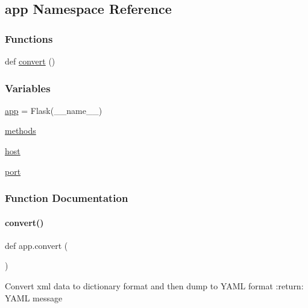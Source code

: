\hypertarget{namespaceapp}{}\subsection{app Namespace Reference}
\label{namespaceapp}
\subsubsection*{Functions}
\begin{DoxyCompactItemize}
\item 
def \mbox{\hyperlink{namespaceapp_a354f40316fa35909af99d6073d4da432}{convert}} ()
\end{DoxyCompactItemize}
\subsubsection*{Variables}
\begin{DoxyCompactItemize}
\item 
\mbox{\hyperlink{namespaceapp_a675b4ea702c13dc4b8c05f985a25b496}{app}} = Flask(\+\_\+\+\_\+name\+\_\+\+\_\+)
\item 
\mbox{\hyperlink{namespaceapp_acc2d9f753751d59302fae3b2bfe99571}{methods}}
\item 
\mbox{\hyperlink{namespaceapp_a7fa7c11c7474c128736b1d34b15a0d5e}{host}}
\item 
\mbox{\hyperlink{namespaceapp_ae996542be63ac459a38531f7c2dd0a49}{port}}
\end{DoxyCompactItemize}


\subsubsection{Function Documentation}
\mbox{\label{namespaceapp_a354f40316fa35909af99d6073d4da432}} 
\paragraph{\texorpdfstring{convert()}{convert()}}
{\footnotesize\ttfamily def app.\+convert (\begin{DoxyParamCaption}{ }\end{DoxyParamCaption})}

\begin{DoxyVerb}Convert xml data to dictionary format and then dump to YAML format
:return:
YAML message
\end{DoxyVerb}
 

